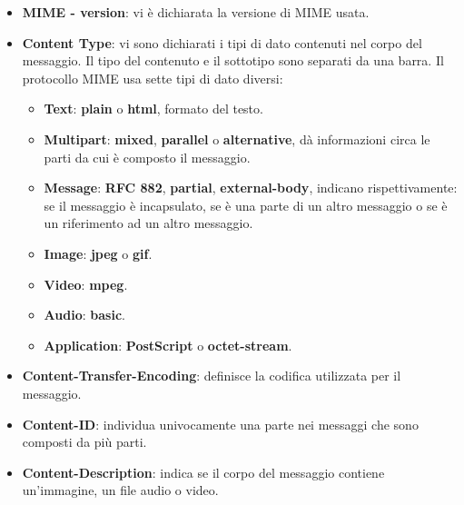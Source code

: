 \documentclass[11pt,a4paper,oneside]{book}
\theoremstyle{definition}
\begin{document}
\begin{itemize}
	\item \textbf{MIME - version}: vi è dichiarata la versione di MIME usata.
	\item \textbf{Content Type}: vi sono dichiarati i tipi di dato contenuti nel corpo del messaggio. Il tipo del contenuto e il sottotipo sono separati da una barra. Il protocollo MIME usa sette tipi di dato diversi:
	      \begin{itemize}
		      \item \textbf{Text}: \textbf{plain} o \textbf{html}, formato del testo.
		      \item \textbf{Multipart}: \textbf{mixed}, \textbf{parallel} o \textbf{alternative}, dà informazioni circa le parti da cui è composto il messaggio.
		      \item \textbf{Message}: \textbf{RFC 882}, \textbf{partial}, \textbf{external-body}, indicano rispettivamente: se il messaggio è incapsulato, se è una parte di un altro messaggio o se è un riferimento ad un altro messaggio.
		      \item \textbf{Image}: \textbf{jpeg} o \textbf{gif}.
		      \item \textbf{Video}: \textbf{mpeg}.
		      \item \textbf{Audio}: \textbf{basic}.
		      \item \textbf{Application}: \textbf{PostScript} o \textbf{octet-stream}.
	      \end{itemize}
	\item \textbf{Content-Transfer-Encoding}: definisce la codifica utilizzata per il messaggio.
	\item \textbf{Content-ID}: individua univocamente una parte nei messaggi che sono composti da più parti.
	\item \textbf{Content-Description}: indica se il corpo del messaggio contiene un'immagine, un file audio o video.
\end{itemize}

\pagebreak
\end{document}
